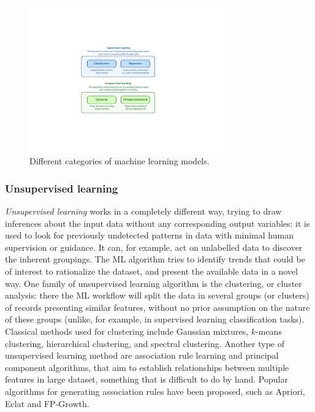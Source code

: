 \documentclass[aip,apm,amsmath,amssymb,reprint]{revtex4-2}
\begin{document}
\begin{figure}[t]
\includegraphics[width=85mm]{categories}
\caption{\label{fig:ML_categories} Different categories of machine learning models.}
\end{figure}


\subsubsection{Unsupervised learning}

\emph{Unsupervised learning} works in a completely different way, trying to draw inferences about the input data without any corresponding output variables: it is used to look for previously undetected patterns in data with minimal human supervision or guidance. It can, for example, act on unlabelled data to discover the inherent groupings. The ML algorithm tries to identify trends that could be of interest to rationalize the dataset, and present the available data in a novel way. One family of unsupervised learning algorithm is the clustering, or cluster analysis: there the ML workflow will split the data in several groups (or clusters) of records presenting similar features, without no prior assumption on the nature of these groups (unlike, for example, in supervised learning classification tasks). Classical methods used for clustering include Gaussian mixtures, $k$-means clustering, hierarchical clustering, and spectral clustering. Another type of unsupervised learning method are association rule learning and principal component algorithms, that aim to establish relationships between multiple features in large dataset, something that is difficult to do by hand. Popular algorithms for generating association rules have been proposed, such as Apriori, Eclat and FP-Growth.
\end{document}
